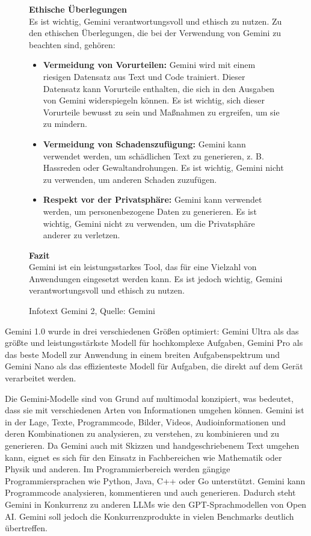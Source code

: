 \begin{figure} 
    \begin{tcolorbox}[colback=gray!20, colframe=gray!20, boxrule=0pt, sharp corners] 
        \textbf{Ethische Überlegungen}\\
        Es ist wichtig, Gemini verantwortungsvoll und ethisch zu nutzen. Zu den ethischen Überlegungen, die bei der Verwendung von Gemini zu beachten sind, gehören:
        \begin{itemize}
            \item \textbf{Vermeidung von Vorurteilen:} Gemini wird mit einem riesigen Datensatz aus Text und Code trainiert. Dieser Datensatz 
            kann Vorurteile enthalten, die sich in den Ausgaben von Gemini widerspiegeln können. Es ist wichtig, sich dieser Vorurteile bewusst 
            zu sein und Maßnahmen zu ergreifen, um sie zu mindern.
            \item \textbf{Vermeidung von Schadenszufügung:} Gemini kann verwendet werden, um schädlichen Text zu generieren, z. B. Hassreden 
            oder Gewaltandrohungen. Es ist wichtig, Gemini nicht zu verwenden, um anderen Schaden zuzufügen.
            \item \textbf{Respekt vor der Privatsphäre:} Gemini kann verwendet werden, um personenbezogene Daten zu generieren. Es ist wichtig, 
            Gemini nicht zu verwenden, um die Privatsphäre anderer zu verletzen.
        \end{itemize}
        \textbf{Fazit}\\
        Gemini ist ein leistungsstarkes Tool, das für eine Vielzahl von Anwendungen eingesetzt werden kann. Es ist jedoch wichtig, Gemini verantwortungsvoll und ethisch zu nutzen.
    \vfill
    \end{tcolorbox}
    \caption{Infotext Gemini 2, Quelle: Gemini}
    \label{InfotextGemini2}
\end{figure}

Gemini 1.0 wurde in drei verschiedenen Größen optimiert: Gemini Ultra als das größte und leistungsstärkste Modell 
für hochkomplexe Aufgaben, Gemini Pro als das beste Modell zur Anwendung in einem breiten Aufgabenspektrum und Gemini 
Nano als das effizienteste Modell für Aufgaben, die direkt auf dem Gerät verarbeitet werden.

Die Gemini-Modelle sind von Grund auf multimodal konzipiert, was bedeutet, dass sie mit verschiedenen Arten von 
Informationen umgehen können. Gemini ist in der Lage, Texte, Programmcode, Bilder, Videos, Audioinformationen und 
deren Kombinationen zu analysieren, zu verstehen, zu kombinieren und zu generieren. Da Gemini auch mit Skizzen und 
handgeschriebenem Text umgehen kann, eignet es sich für den Einsatz in Fachbereichen wie Mathematik oder Physik und 
anderen. Im Programmierbereich werden gängige Programmiersprachen wie Python, Java, C++ oder Go unterstützt. Gemini 
kann Programmcode analysieren, kommentieren und auch generieren. Dadurch steht Gemini in Konkurrenz zu anderen LLMs 
wie den GPT-Sprachmodellen von Open AI. Gemini soll jedoch die Konkurrenzprodukte in vielen Benchmarks deutlich übertreffen.

